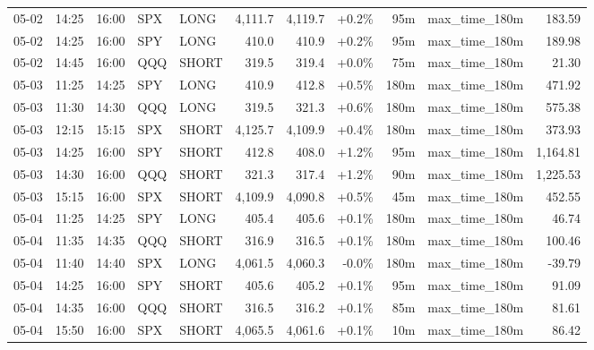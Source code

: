 \documentclass[11pt,a4paper,twoside]{article}
\begin{document}
\begin{center}
\begin{longtable}{>{\color{txtmain}}l l l l l r r r r >{\color{txtmain}}l r}
05-02 & 14:25 & 16:00 & SPX & LONG & 4,111.7 & 4,119.7 & \textcolor{wingreen}{+0.2\%} & 95m & max\_time\_180m & \textcolor{wingreen}{183.59} \\
05-02 & 14:25 & 16:00 & SPY & LONG & 410.0 & 410.9 & \textcolor{wingreen}{+0.2\%} & 95m & max\_time\_180m & \textcolor{wingreen}{189.98} \\
05-02 & 14:45 & 16:00 & QQQ & SHORT & 319.5 & 319.4 & \textcolor{wingreen}{+0.0\%} & 75m & max\_time\_180m & \textcolor{wingreen}{21.30} \\
05-03 & 11:25 & 14:25 & SPY & LONG & 410.9 & 412.8 & \textcolor{wingreen}{+0.5\%} & 180m & max\_time\_180m & \textcolor{wingreen}{471.92} \\
05-03 & 11:30 & 14:30 & QQQ & LONG & 319.5 & 321.3 & \textcolor{wingreen}{+0.6\%} & 180m & max\_time\_180m & \textcolor{wingreen}{575.38} \\
05-03 & 12:15 & 15:15 & SPX & SHORT & 4,125.7 & 4,109.9 & \textcolor{wingreen}{+0.4\%} & 180m & max\_time\_180m & \textcolor{wingreen}{373.93} \\
05-03 & 14:25 & 16:00 & SPY & SHORT & 412.8 & 408.0 & \textcolor{wingreen}{+1.2\%} & 95m & max\_time\_180m & \textcolor{wingreen}{1,164.81} \\
05-03 & 14:30 & 16:00 & QQQ & SHORT & 321.3 & 317.4 & \textcolor{wingreen}{+1.2\%} & 90m & max\_time\_180m & \textcolor{wingreen}{1,225.53} \\
05-03 & 15:15 & 16:00 & SPX & SHORT & 4,109.9 & 4,090.8 & \textcolor{wingreen}{+0.5\%} & 45m & max\_time\_180m & \textcolor{wingreen}{452.55} \\
05-04 & 11:25 & 14:25 & SPY & LONG & 405.4 & 405.6 & \textcolor{wingreen}{+0.1\%} & 180m & max\_time\_180m & \textcolor{wingreen}{46.74} \\
05-04 & 11:35 & 14:35 & QQQ & SHORT & 316.9 & 316.5 & \textcolor{wingreen}{+0.1\%} & 180m & max\_time\_180m & \textcolor{wingreen}{100.46} \\
05-04 & 11:40 & 14:40 & SPX & LONG & 4,061.5 & 4,060.3 & \textcolor{lossred}{-0.0\%} & 180m & max\_time\_180m & \textcolor{lossred}{-39.79} \\
05-04 & 14:25 & 16:00 & SPY & SHORT & 405.6 & 405.2 & \textcolor{wingreen}{+0.1\%} & 95m & max\_time\_180m & \textcolor{wingreen}{91.09} \\
05-04 & 14:35 & 16:00 & QQQ & SHORT & 316.5 & 316.2 & \textcolor{wingreen}{+0.1\%} & 85m & max\_time\_180m & \textcolor{wingreen}{81.61} \\
05-04 & 15:50 & 16:00 & SPX & SHORT & 4,065.5 & 4,061.6 & \textcolor{wingreen}{+0.1\%} & 10m & max\_time\_180m & \textcolor{wingreen}{86.42} \\

\end{longtable}
\end{center}
\end{document}

